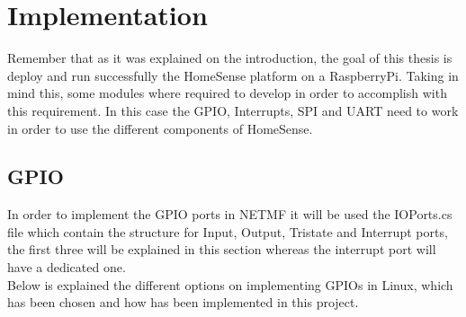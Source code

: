 \section{Implementation}\label{S:Implementation}
Remember that as it was explained on the introduction, the goal of this thesis is deploy and run successfully the HomeSense platform on a RaspberryPi. Taking in mind this, some modules where required to develop in order to accomplish with this requirement. In this case the GPIO, Interrupts, SPI and UART need to work in order to use the different components of HomeSense.

\subsection{GPIO}\label{SS:GPIO}
In order to implement the GPIO ports in NETMF it will be used the IOPorts.cs file which contain the structure for Input, Output, Tristate and Interrupt ports, the first three will be explained in this section whereas the interrupt port will have a dedicated one.
\\
Below is explained the different options on implementing GPIOs in Linux, which has been chosen and how has been implemented in this project.

